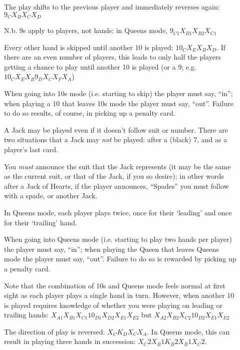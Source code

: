 \documentclass[12pt]{article}
\begin{document}
\begin{description}
  \item[]
    The play shifts to the previous player and immediately reverses again: $9_C X_B X_C X_D$

    N.b. 9s apply to players, not hands: in Queens mode, $9_{C1} X_{B1} X_{B2} X_{C1}$

  \item[]
    Every other hand is skipped until another 10 is played: $10_C X_E X_B X_D$.  If there are an even number of
    players, this leads to only half the players getting a chance to play until another
    10 is played (or a 9; e.g.  $10_C X_E X_B 9_D X_C X_F X_A$)

    When going into 10s mode (i.e. starting to skip) the player must say, ``in''; when playing a
    10 that leaves 10s mode the player must say, ``out''.  Failure to do so results, of course,
    in picking up a penalty card.

  \item[]
    A Jack may be played even if it doesn't follow suit or number.  There are two situations
    that a Jack may \emph{not} be played:  after a (black) 7, and as a player's last card.

    You \emph{must} announce the suit that the Jack represents (it may be the same as the
    current suit, or that of the Jack, if you so desire);  in other words after a Jack of
    Hearts, if the player announces, ``Spades'' you must follow with a spade, or another Jack.

  \item[]
    In Queens mode, each player plays twice, once for their `leading' and once for their
    `trailing' hand.

    When going into Queens mode (i.e. starting to play two hands per player) the player must say, ``in''; when playing
    the Queen that leaves Queens mode the player must say, ``out''.  Failure to do so is rewarded by picking up a
    penalty card.

    Note that the combination of 10s and Queens mode feels normal at first sight as each player plays a single hand in
    turn.  However, when another 10 is played requires knowledge of whether you were playing on leading or trailing
    hands: $X_{A1} X_{B1} X_{C1} 10_{D1} X_{D2} X_{E1} X_{E2}$ but $X_{A2} X_{B2} X_{C2} 10_{D2} X_{E1} X_{E2}$

  \item[]
    The direction of play is reversed: $X_C K_D X_C X_A$.  In Queens mode, this can result in playing
    three hands in succession: $X_C2 X_B1 K_B2 X_B1 X_C2$.

\end{description}
\end{document}
